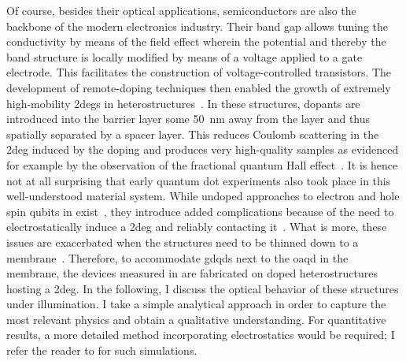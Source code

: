 Of course, besides their optical applications, semiconductors are also the backbone of the modern electronics industry.
Their band gap allows tuning the conductivity by means of the field effect wherein the potential and thereby the band structure is locally modified by means of a voltage applied to a gate electrode.
This facilitates the construction of voltage-controlled transistors.
The development of remote-doping techniques then enabled the growth of extremely high-mobility \glspl{2deg} in \GaAsAlGaAs heterostructures~\cite{Ihn2009}.
In these structures, dopants are introduced into the  barrier layer some \qty{50}{\nano\meter} away from the  layer and thus spatially separated by a  spacer layer.
This reduces Coulomb scattering in the \gls{2deg} induced by the doping and produces very high-quality samples as evidenced for example by the observation of the fractional quantum Hall effect~\cite{Stormer1999a}.
It is hence not at all surprising that early quantum dot experiments also took place in this well-understood material system.
While undoped approaches to electron and hole spin qubits in  exist~\cite{Harrell1999,Chen2012,Li2014,Tracy2014}, they introduce added complications because of the need to electrostatically induce a \gls{2deg} and reliably contacting it~\cite{Rossler2016}.
What is more, these issues are exacerbated when the structures need to be thinned down to a membrane~\cite{Descamps2021,Kindel2025}.
Therefore, to accommodate \glspl{gdqd} next to the \gls{oaqd} in the membrane, the devices measured in \thispart are fabricated on doped heterostructures hosting a \gls{2deg}.
In the following, I discuss the optical behavior of these structures under illumination.
I take a simple analytical approach in order to capture the most relevant physics and obtain a qualitative understanding.
For quantitative results, a more detailed method incorporating electrostatics would be required; I refer the reader to  for such simulations.

